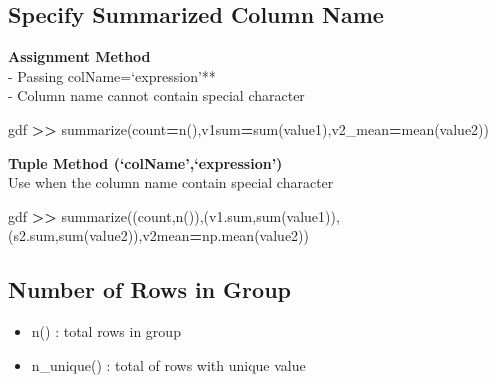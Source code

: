 \documentclass[
]{book}
\newenvironment{Shaded}{\begin{snugshade}}{\end{snugshade}}
\newcommand{\NormalTok}[1]{#1}
\newcommand{\OperatorTok}[1]{\textcolor[rgb]{0.43,0.43,0.43}{\textbf{#1}}}
\newcommand{\StringTok}[1]{\textcolor[rgb]{0.5,0.5,0.5}{#1}}
\providecommand{\tightlist}{%
  \setlength{\itemsep}{0pt}\setlength{\parskip}{0pt}}
\begin{document}
\hypertarget{specify-summarized-column-name}{%
\subsection{Specify Summarized Column Name}\label{specify-summarized-column-name}}

\textbf{Assignment Method}\\
- Passing colName=`expression'**\\
- Column name cannot contain special character

\begin{Shaded}
\begin{Highlighting}[]
\NormalTok{gdf }\OperatorTok{\textgreater{}\textgreater{}}\NormalTok{ summarize(count}\OperatorTok{=}\StringTok{\textquotesingle{}n()\textquotesingle{}}\NormalTok{,v1sum}\OperatorTok{=}\StringTok{\textquotesingle{}sum(value1)\textquotesingle{}}\NormalTok{,v2\_mean}\OperatorTok{=}\StringTok{\textquotesingle{}mean(value2)\textquotesingle{}}\NormalTok{)}
\end{Highlighting}
\end{Shaded}

\textbf{Tuple Method (`colName',`expression')}\\
Use when the column name contain special character

\begin{Shaded}
\begin{Highlighting}[]
\NormalTok{gdf }\OperatorTok{\textgreater{}\textgreater{}}\NormalTok{ summarize((}\StringTok{\textquotesingle{}count\textquotesingle{}}\NormalTok{,}\StringTok{\textquotesingle{}n()\textquotesingle{}}\NormalTok{),(}\StringTok{\textquotesingle{}v1.sum\textquotesingle{}}\NormalTok{,}\StringTok{\textquotesingle{}sum(value1)\textquotesingle{}}\NormalTok{),(}\StringTok{\textquotesingle{}s2.sum\textquotesingle{}}\NormalTok{,}\StringTok{\textquotesingle{}sum(value2)\textquotesingle{}}\NormalTok{),v2mean}\OperatorTok{=}\NormalTok{np.mean(value2))}
\end{Highlighting}
\end{Shaded}

\hypertarget{number-of-rows-in-group}{%
\subsection{Number of Rows in Group}\label{number-of-rows-in-group}}

\begin{itemize}
\tightlist
\item
  n() : total rows in group\\
\item
  n\_unique() : total of rows with unique value
\end{itemize}
\end{document}
